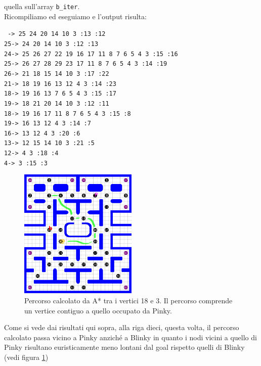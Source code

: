 \documentclass[8pt]{book}
\begin{document}
quella sull'array \texttt{b\_iter}.\\
Ricompiliamo ed eseguiamo e l'output risulta:

\texttt{
  -\textgreater{} 25 24 20 14 10 3 :13 :12\\
  25-\textgreater{} 24 20 14 10 3 :12 :13\\ 
  24-\textgreater{} 25 26 27 22 19 16 17 11 8 7 6 5 4 3 :15 :16\\ 
  25-\textgreater{} 26 27 28 29 23 17 11 8 7 6 5 4 3 :14 :19\\ 
  26-\textgreater{} 21 18 15 14 10 3 :17 :22\\ 
  21-\textgreater{} 18 19 16 13 12 4 3 :14 :23\\
  18-\textgreater{} 19 16 13 7 6 5 4 3 :15 :17\\
  19-\textgreater{} 18 21 20 14 10 3 :12 :11\\
  18-\textgreater{} 19 16 17 11 8 7 6 5 4 3 :15 :8\\
  19-\textgreater{} 16 13 12 4 3 :14 :7\\
  16-\textgreater{} 13 12 4 3 :20 :6\\
  13-\textgreater{} 12 15 14 10 3 :21 :5\\
  12-\textgreater{} 4 3 :18 :4\\
  4-\textgreater{} 3 :15 :3\\
}

\begin{figure}[H]
  \centering
  \includegraphics[width=0.5\textwidth]{img/Astar_7.png}
  \caption{Percorso calcolato da A* tra i vertici 18 e 3. Il percorso comprende un vertice contiguo a quello occupato da Pinky.}
  \label{Astar_7}
\end{figure}

Come si vede dai risultati qui sopra, alla riga dieci, questa volta, il percorso calcolato passa vicino a Pinky anziché a Blinky in quanto i nodi vicini a quello di Pinky risultano euristicamente meno lontani dal goal rispetto quelli di Blinky (vedi figura \ref{Astar_7})
\end{document}
